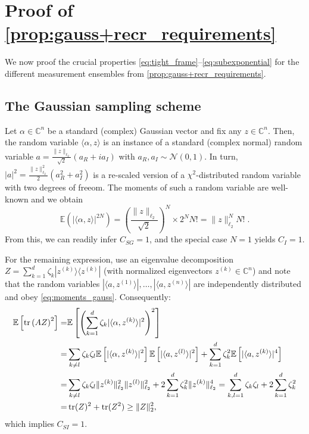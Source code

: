\section{Proof of \cref{prop:gauss+recr_requirements}}
\label{sec:pl.gauss+recr_requirements}

We now proof the crucial properties \eqref{eq:tight_frame}--\eqref{eq:subexponential} for the different measurement ensembles from \cref{prop:gauss+recr_requirements}.

\subsection{The Gaussian sampling scheme}


Let $\alpha \in \mathbb{C}^n$ be a standard (complex) Gaussian vector and fix any $ z \in \mathbb{C}^n$.
Then, the random variable $\langle \alpha, z \rangle$ is an instance of a standard (complex normal) random variable $a = \tfrac{\|  z \|_{\ell_2}}{\sqrt{2}} \left(a_R + i a_I\right)$ with $a_R, a_I \sim \mathcal{N}(0,1)$.
In turn, $|a|^2 = \frac{\|  z \|_{\ell_2}^2}{2} (a_R^2 + a_I^2)$ is a re-scaled version of a $\chi^2$-distributed random variable with two degrees of freeom. The moments of such a random variable are well-known and we obtain
\begin{equation}
  \mathbb{E} (| \langle \alpha, z \rangle|^{2N})= \left( \frac{ \|  z \|_{\ell_2}}{\sqrt{2}}\right)^N \times 2^N N! = \|  z \|_{\ell_2}^N N! \; .\label{eq:moments_gauss}
\end{equation}
From this, we can readily infer $C_{SG} = 1$, and the special case $N=1$  yields $C_I=1$.

For the remaining expression, use an eigenvalue decomposition $ Z = \sum_{k=1}^d \zeta_k | z^{(k)} \rangle \langle  z^{(k)}|$ (with normalized eigenvectors $ z^{(k)}\in \mathbb{C}^n$) and note that the random variables $|\langle  a, z^{(1)} \rangle|,\ldots, | \langle  a, z^{(n)} \rangle|$ are independently distributed and obey \cref{eq:moments_gauss}.
Consequently:
\begin{align*}
  \mathbb{E} \left[ \operatorname{tr} \left(  A  Z \right)^2 \right]
  =& \mathbb{E} \left[ \left( \sum_{k=1}^d \zeta_k | \langle \alpha, z^{(k)} \rangle|^2 \right)^2 \right] \\
  =& \sum_{k \neq l} \zeta_k \zeta_l \mathbb{E} \left[ |\langle \alpha, z^{(k)} \rangle|^2 \right] \mathbb{E} \left[ | \langle  a, z^{(l)} \rangle|^2 \right]
  + \sum_{k=1}^d \zeta_k^2 \mathbb{E} \left[ | \langle  a,  z^{(k)} \rangle|^4 \right] \\
  =& \sum_{k \neq l} \zeta_k \zeta_l \| z^{(k)} \|_{\ell_2}^2 \|  z^{(l)} \|_{\ell_2}^2 + 2 \sum_{k=1}^d \zeta_k^2 \|  z^{(k)} \|_{\ell_2}^4
  = \sum_{k,l=1}^d \zeta_k \zeta_l + 2\sum_{k=1}^d \zeta_k^2 \\
  =& \operatorname{tr} ( Z)^2 + \operatorname{tr} ( Z^2)
  \geq \|  Z \|_2^2,
\end{align*}
which implies $C_{SI} = 1$.

